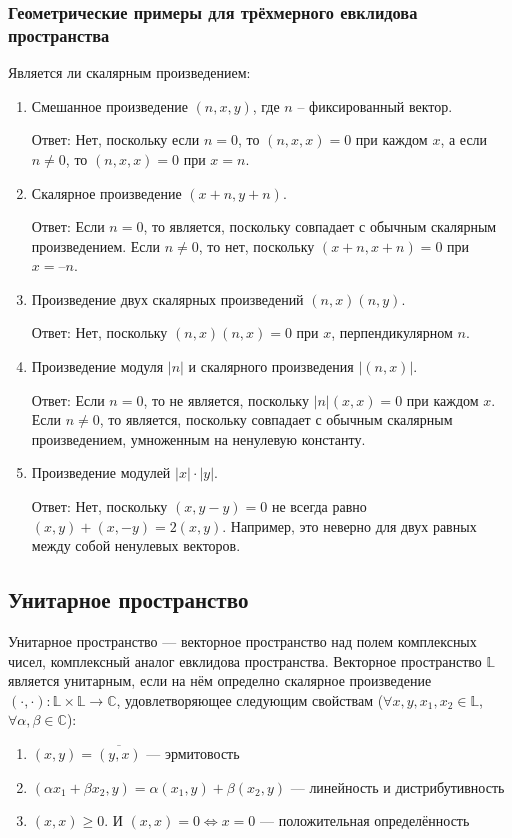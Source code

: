 \documentclass[12pt]{article}
\begin{document}
\subsubsection{Геометрические примеры для трёхмерного евклидова пространства}

Является ли скалярным произведением:
\begin{enumerate}
    \item Смешанное произведение $(n, x, y)$, где $n$ – фиксированный вектор.

          Ответ: Нет, поскольку если $n = 0$, то $(n, x, x) = 0$ при каждом $x$, а если $n\neq 0$, то $(n, x, x) = 0$ при $x = n$.

    \item Скалярное произведение $(x + n, y + n)$.

          Ответ: Если $n = 0$, то является, поскольку совпадает с обычным скалярным произведением. Если $n \neq 0$, то нет,
          поскольку $(x + n, x + n) = 0$ при $x = –n$.

    \item Произведение двух скалярных произведений $(n, x)(n, y)$.

          Ответ: Нет, поскольку $(n, x)(n, x) = 0$ при $x$, перпендикулярном $n$.

    \item Произведение модуля $|n|$ и скалярного произведения $|(n, x)|$.

          Ответ: Если $n = 0$, то не является, поскольку $|n|(x, x) = 0$ при каждом $x$. Если $n \neq 0$, то является, поскольку
          совпадает с обычным скалярным произведением, умноженным на ненулевую константу.

    \item Произведение модулей $|x|\cdot |y|$.

          Ответ: Нет, поскольку $(x, y - y) = 0$ не всегда равно $(x, y) + (x, -y) = 2(x, y)$. Например, это неверно для двух
          равных между собой ненулевых векторов.
\end{enumerate}

\subsection{Унитарное пространство}
Унитарное пространство — векторное пространство над полем комплексных чисел, комплексный аналог евклидова пространства. Векторное пространство $\mathbb{L}$ является унитарным, если на нём определно скалярное произведение $(\cdot, \cdot) : \mathbb{L} \times \mathbb{L} \rightarrow \mathbb{C}$, удовлетворяющее следующим свойствам ($\forall x, y, x_1, x_2 \in \mathbb{L}$, $\forall \alpha, \beta \in \mathbb{C}$):
\begin{enumerate}
    \item $(x, y) = \overline{(y, x)}$ --- эрмитовость
    \item $(\alpha x_1 + \beta x_2, y) = \alpha(x_1, y) + \beta(x_2, y)$ --- линейность и дистрибутивность
    \item $(x, x) \geq 0$. И $(x, x) = 0 \Leftrightarrow x = 0$ --- положительная определённость
\end{enumerate}
\end{document}
